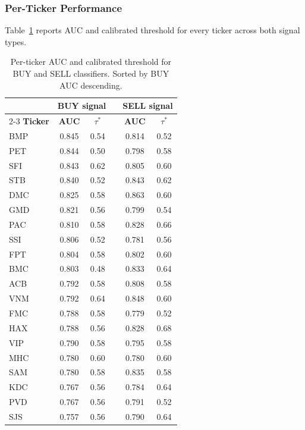 \documentclass[12pt, a4paper]{article}
\begin{document}
\subsubsection{Per-Ticker Performance}

Table~\ref{tab:t3_perticker} reports AUC and calibrated threshold
for every ticker across both signal types.

\begin{table}[h]
\centering
\small
\caption{Per-ticker AUC and calibrated threshold for BUY and SELL
         classifiers. Sorted by BUY AUC descending.}
\label{tab:t3_perticker}
\renewcommand{\arraystretch}{1.2}
\begin{tabular}{l cc c cc}
\hline
& \multicolumn{2}{c}{\textbf{BUY signal}}
& \phantom{xx}
& \multicolumn{2}{c}{\textbf{SELL signal}} \\
\cmidrule{2-3} \cmidrule{5-6}
\textbf{Ticker} & \textbf{AUC} & $\tau^*$
&
& \textbf{AUC} & $\tau^*$ \\
\hline
BMP   & 0.845 & 0.54 && 0.814 & 0.52 \\
PET   & 0.844 & 0.50 && 0.798 & 0.58 \\
SFI   & 0.843 & 0.62 && 0.805 & 0.60 \\
STB   & 0.840 & 0.52 && 0.843 & 0.62 \\
DMC   & 0.825 & 0.58 && 0.863 & 0.60 \\
GMD   & 0.821 & 0.56 && 0.799 & 0.54 \\
PAC   & 0.810 & 0.58 && 0.828 & 0.66 \\
SSI   & 0.806 & 0.52 && 0.781 & 0.56 \\
FPT   & 0.804 & 0.58 && 0.802 & 0.60 \\
BMC   & 0.803 & 0.48 && 0.833 & 0.64 \\
ACB   & 0.792 & 0.58 && 0.808 & 0.58 \\
VNM   & 0.792 & 0.64 && 0.848 & 0.60 \\
FMC   & 0.788 & 0.58 && 0.779 & 0.52 \\
HAX   & 0.788 & 0.56 && 0.828 & 0.68 \\
VIP   & 0.790 & 0.58 && 0.795 & 0.58 \\
MHC   & 0.780 & 0.60 && 0.780 & 0.60 \\
SAM   & 0.780 & 0.58 && 0.835 & 0.58 \\
KDC   & 0.767 & 0.56 && 0.784 & 0.64 \\
PVD   & 0.767 & 0.56 && 0.791 & 0.52 \\
SJS   & 0.757 & 0.56 && 0.790 & 0.64 \\

\end{tabular}
\end{table}
\end{document}
